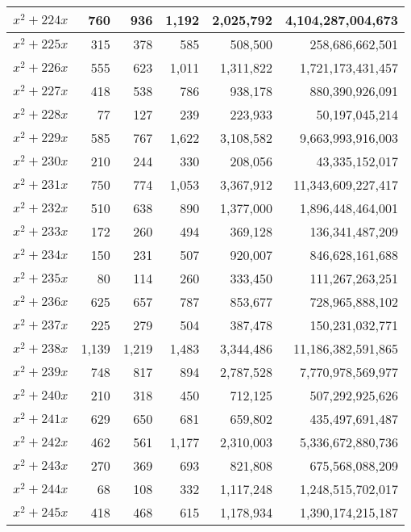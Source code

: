 \documentclass[a4paper]{amsproc}
\theoremstyle{plain}
\theoremstyle{named}
\begin{document}
\begin{longtable}{ | l | r | r | r | r | r | }
$x^2 + 224x$ & 760 & 936 & 1{,}192 & 2{,}025{,}792 & 4{,}104{,}287{,}004{,}673 \\ \hline
$x^2 + 225x$ & 315 & 378 & 585 & 508{,}500 & 258{,}686{,}662{,}501 \\ \hline
$x^2 + 226x$ & 555 & 623 & 1{,}011 & 1{,}311{,}822 & 1{,}721{,}173{,}431{,}457 \\ \hline
$x^2 + 227x$ & 418 & 538 & 786 & 938{,}178 & 880{,}390{,}926{,}091 \\ \hline
$x^2 + 228x$ & 77 & 127 & 239 & 223{,}933 & 50{,}197{,}045{,}214 \\ \hline
$x^2 + 229x$ & 585 & 767 & 1{,}622 & 3{,}108{,}582 & 9{,}663{,}993{,}916{,}003 \\ \hline
$x^2 + 230x$ & 210 & 244 & 330 & 208{,}056 & 43{,}335{,}152{,}017 \\ \hline
$x^2 + 231x$ & 750 & 774 & 1{,}053 & 3{,}367{,}912 & 11{,}343{,}609{,}227{,}417 \\ \hline
$x^2 + 232x$ & 510 & 638 & 890 & 1{,}377{,}000 & 1{,}896{,}448{,}464{,}001 \\ \hline
$x^2 + 233x$ & 172 & 260 & 494 & 369{,}128 & 136{,}341{,}487{,}209 \\ \hline
$x^2 + 234x$ & 150 & 231 & 507 & 920{,}007 & 846{,}628{,}161{,}688 \\ \hline
$x^2 + 235x$ & 80 & 114 & 260 & 333{,}450 & 111{,}267{,}263{,}251 \\ \hline
$x^2 + 236x$ & 625 & 657 & 787 & 853{,}677 & 728{,}965{,}888{,}102 \\ \hline
$x^2 + 237x$ & 225 & 279 & 504 & 387{,}478 & 150{,}231{,}032{,}771 \\ \hline
$x^2 + 238x$ & 1{,}139 & 1{,}219 & 1{,}483 & 3{,}344{,}486 & 11{,}186{,}382{,}591{,}865 \\ \hline
$x^2 + 239x$ & 748 & 817 & 894 & 2{,}787{,}528 & 7{,}770{,}978{,}569{,}977 \\ \hline
$x^2 + 240x$ & 210 & 318 & 450 & 712{,}125 & 507{,}292{,}925{,}626 \\ \hline
$x^2 + 241x$ & 629 & 650 & 681 & 659{,}802 & 435{,}497{,}691{,}487 \\ \hline
$x^2 + 242x$ & 462 & 561 & 1{,}177 & 2{,}310{,}003 & 5{,}336{,}672{,}880{,}736 \\ \hline
$x^2 + 243x$ & 270 & 369 & 693 & 821{,}808 & 675{,}568{,}088{,}209 \\ \hline
$x^2 + 244x$ & 68 & 108 & 332 & 1{,}117{,}248 & 1{,}248{,}515{,}702{,}017 \\ \hline
$x^2 + 245x$ & 418 & 468 & 615 & 1{,}178{,}934 & 1{,}390{,}174{,}215{,}187 \\ \hline

\end{longtable}
\end{document}
